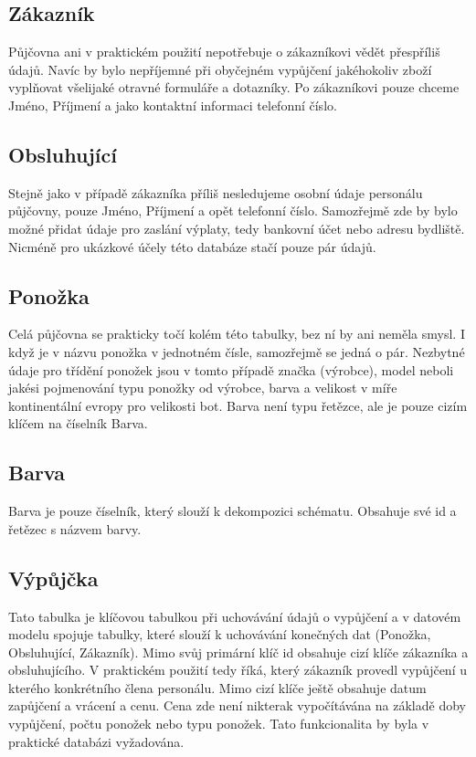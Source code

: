 \documentclass[titlepage]{article}
\begin{document}
\subsection{Zákazník}
Půjčovna ani v praktickém použití nepotřebuje o zákazníkovi vědět přespříliš
údajů. Navíc by bylo nepříjemné při obyčejném vypůjčení jakéhokoliv zboží
vyplňovat všelijaké otravné formuláře a dotazníky. Po zákazníkovi pouze chceme
Jméno, Příjmení a jako kontaktní informaci telefonní číslo.

\subsection{Obsluhující}
Stejně jako v případě zákazníka příliš nesledujeme osobní údaje personálu
půjčovny, pouze Jméno, Příjmení a opět telefonní číslo. Samozřejmě zde by bylo
možné přidat údaje pro zaslání výplaty, tedy bankovní účet nebo adresu
bydliště. Nicméně pro ukázkové účely této databáze stačí pouze pár údajů.

\subsection{Ponožka}
Celá půjčovna se prakticky točí kolém této tabulky, bez ní by ani neměla smysl.
I když je v názvu ponožka v jednotném čísle, samozřejmě se jedná o pár.
Nezbytné údaje pro třídění ponožek jsou v tomto případě značka (výrobce), model
neboli jakési pojmenování typu ponožky od výrobce, barva a velikost v míře
kontinentální evropy pro velikosti bot. Barva není typu řetězce, ale je pouze
cizím klíčem na číselník Barva.

\subsection{Barva}
Barva je pouze číselník, který slouží k dekompozici schématu. Obsahuje své id a
řetězec s názvem barvy.

\subsection{Výpůjčka}
Tato tabulka je klíčovou tabulkou při uchovávání údajů o vypůjčení a v datovém
modelu spojuje tabulky, které slouží k uchovávání konečných dat (Ponožka,
Obsluhující, Zákazník). Mimo svůj primární klíč id obsahuje cizí klíče
zákazníka a obsluhujícího.  V praktickém použití tedy říká, který zákazník
provedl vypůjčení u kterého konkrétního člena personálu. Mimo cizí klíče ještě
obsahuje datum zapůjčení a vrácení a cenu. Cena zde není nikterak vypočítávána
na základě doby vypůjčení, počtu ponožek nebo typu ponožek. Tato funkcionalita
by byla v praktické databázi vyžadována.
\end{document}
